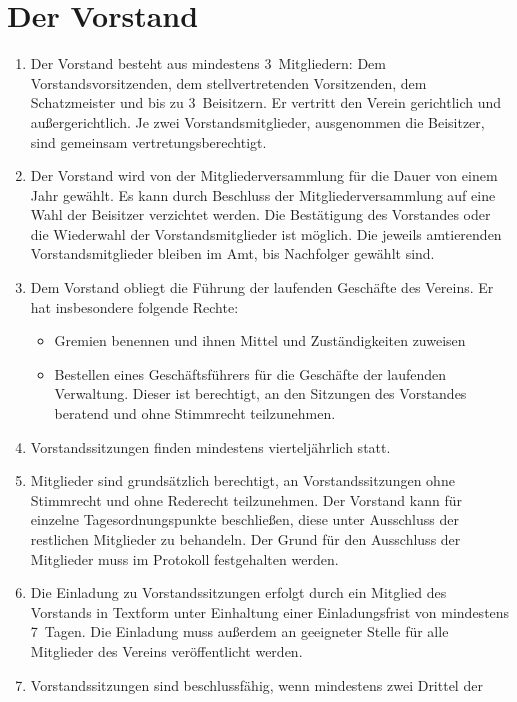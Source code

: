 \documentclass[a4paper,12pt]{scrartcl}
\begin{document}
\section{Der Vorstand}
\begin{enumerate}
  \item Der Vorstand besteht aus mindestens 3~Mitgliedern: Dem
    Vorstandsvorsitzenden, dem stellvertretenden Vorsitzenden, dem Schatzmeister
    und bis zu 3~Beisitzern. Er vertritt den Verein gerichtlich und
    außergerichtlich. Je zwei Vorstandsmitglieder, ausgenommen die Beisitzer, 
    sind gemeinsam vertretungsberechtigt.
  \item Der Vorstand wird von der Mitgliederversammlung für die Dauer von einem
    Jahr gewählt. Es kann durch Beschluss der Mitgliederversammlung auf eine
    Wahl der Beisitzer verzichtet werden. Die Bestätigung des Vorstandes oder
    die Wiederwahl der Vorstandsmitglieder ist möglich. Die jeweils amtierenden
    Vorstandsmitglieder bleiben im Amt, bis Nachfolger gewählt sind.
  \item Dem Vorstand obliegt die Führung der laufenden Geschäfte des Vereins. Er
    hat insbesondere folgende Rechte:
    \begin{itemize}
      \item Gremien benennen und ihnen Mittel und Zuständigkeiten zuweisen
      \item Bestellen eines Geschäftsführers für die Geschäfte der laufenden
        Verwaltung. Dieser ist berechtigt, an den Sitzungen des Vorstandes
        beratend und ohne Stimmrecht teilzunehmen.
    \end{itemize}
  \item Vorstandssitzungen finden mindestens vierteljährlich statt.
  \item Mitglieder sind grundsätzlich berechtigt, an Vorstandssitzungen ohne
    Stimmrecht und ohne Rederecht teilzunehmen. Der Vorstand kann für einzelne
    Tagesordnungspunkte beschließen, diese unter Ausschluss der restlichen
    Mitglieder zu behandeln. Der Grund für den Ausschluss der Mitglieder muss im
    Protokoll festgehalten werden.
  \item Die Einladung zu Vorstandssitzungen erfolgt durch ein Mitglied des
    Vorstands in Textform
    unter Einhaltung einer Einladungsfrist von mindestens 7~Tagen. Die Einladung
    muss außerdem an geeigneter Stelle für alle Mitglieder des Vereins
    veröffentlicht werden.
  \item Vorstandssitzungen sind beschlussfähig, wenn mindestens zwei Drittel der

\end{enumerate}
\end{document}

